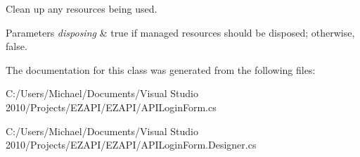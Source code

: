 Clean up any resources being used. 


\begin{DoxyParams}{Parameters}
{\em disposing} & true if managed resources should be disposed; otherwise, false.\\
\hline
\end{DoxyParams}


The documentation for this class was generated from the following files\-:\begin{DoxyCompactItemize}
\item 
C\-:/\-Users/\-Michael/\-Documents/\-Visual Studio 2010/\-Projects/\-E\-Z\-A\-P\-I/\-E\-Z\-A\-P\-I/A\-P\-I\-Login\-Form.\-cs\item 
C\-:/\-Users/\-Michael/\-Documents/\-Visual Studio 2010/\-Projects/\-E\-Z\-A\-P\-I/\-E\-Z\-A\-P\-I/A\-P\-I\-Login\-Form.\-Designer.\-cs\end{DoxyCompactItemize}
